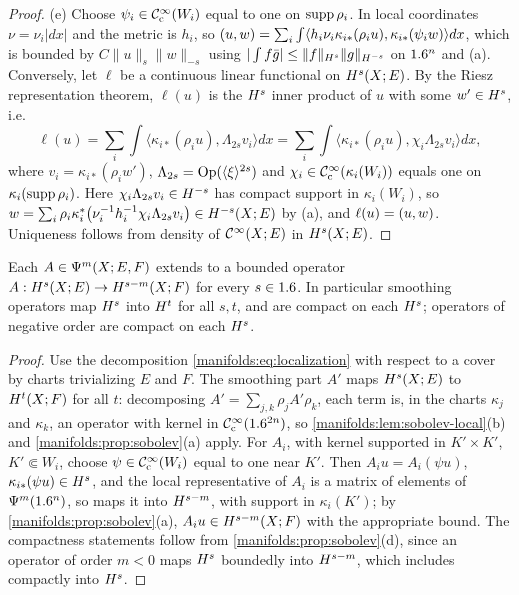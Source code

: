 \begin{proof}
(e) Choose $\psi_i\in\mathcal{C}^\infty_{\mathrm{c}}(W_i)$ equal to one on $\operatorname{supp}\rho_i$. In local coordinates
$\nu=\nu_i|dx|$ and the metric is $h_i$, so
$( u, w)=\sum_i\int\langle h_i\nu_i\kappa_{i*}(\rho_iu),\kappa_{i*}(\psi_iw)\rangle dx$,
which is bounded by $C\|u\|_s\|w\|_{-s}$ using $|\int f\bar g|\le\|f\|_{H^{s}}\|g\|_{H^{-s}}$ on
$1.6^n$ and (a). Conversely, let $\ell$ be a continuous linear functional on
$H^{s}(X;E)$. By the Riesz representation theorem, $\ell(u)$ is the $H^{s}$ inner
product of $u$ with some $w'\in H^{s}$, i.e.
\begin{equation*}
\ell(u)=\sum_i\int\big\langle\kappa_{i*}(\rho_iu),\Lambda_{2s}v_i\big\rangle dx
=\sum_i\int\big\langle\kappa_{i*}(\rho_iu),\chi_i\Lambda_{2s}v_i\big\rangle dx,
\end{equation*}
where $v_i=\kappa_{i*}(\rho_iw')$, $\Lambda_{2s}=\operatorname{Op}(\langle \xi\rangle^{2s})$ and $\chi_i\in\mathcal{C}^\infty_{\mathrm{c}}(\kappa_i(W_i))$
equals one on $\kappa_i(\operatorname{supp}\rho_i)$. Here $\chi_i\Lambda_{2s}v_i\in H^{-s}$ has compact support in
$\kappa_i(W_i)$, so $w=\sum_i\rho_i\kappa_i^*\big(\nu_i^{-1}h_i^{-1}\chi_i\Lambda_{2s}v_i\big)\in H^{-s}(X;E)$ by (a), and
$\ell(u)=( u, w)$. Uniqueness follows from density of $\mathcal{C}^\infty(X;E)$ in $H^{s}(X;E)$.
\end{proof}

\begin{theorem}\label{manifolds:thm:sobolev-bounded}
Each $A\in\Psi^{m}(X;E,F)$ extends to a bounded operator
$A:H^{s}(X;E)\to H^{s-m}(X;F)$ for every $s\in1.6$. In particular smoothing operators
map $H^{s}$ into $H^{t}$ for all $s,t$, and are compact on each $H^{s}$; operators of
negative order are compact on each $H^{s}$.
\end{theorem}
\begin{proof}
Use the decomposition \eqref{manifolds:eq:localization} with respect to a
cover by charts trivializing $E$ and $F$. The smoothing part $A'$ maps
$H^{s}(X;E)$ to $H^{t}(X;F)$ for all $t$: decomposing $A'=\sum_{j,k}\rho_jA'\rho_k$, each
term is, in the charts $\kappa_j$ and $\kappa_k$, an operator with kernel in
$\mathcal{C}^\infty_{\mathrm{c}}(1.6^{2n})$, so \cref{manifolds:lem:sobolev-local}(b) and
\cref{manifolds:prop:sobolev}(a) apply. For $A_i$, with kernel supported in
$K'\times K'$, $K'\Subset W_i$, choose $\psi\in\mathcal{C}^\infty_{\mathrm{c}}(W_i)$ equal to one near $K'$. Then
$A_iu=A_i(\psi u)$, $\kappa_{i*}(\psi u)\in H^{s}$, and the local representative of
$A_i$ is a matrix of elements of $\Psi^{m}(1.6^n)$, so maps it into $H^{s-m}$,
with support in $\kappa_i(K')$; by \cref{manifolds:prop:sobolev}(a),
$A_iu\in H^{s-m}(X;F)$ with the appropriate bound. The compactness statements
follow from \cref{manifolds:prop:sobolev}(d), since an operator of order $m<0$ maps
$H^{s}$ boundedly into $H^{s-m}$, which includes compactly into $H^{s}$.
\end{proof}

